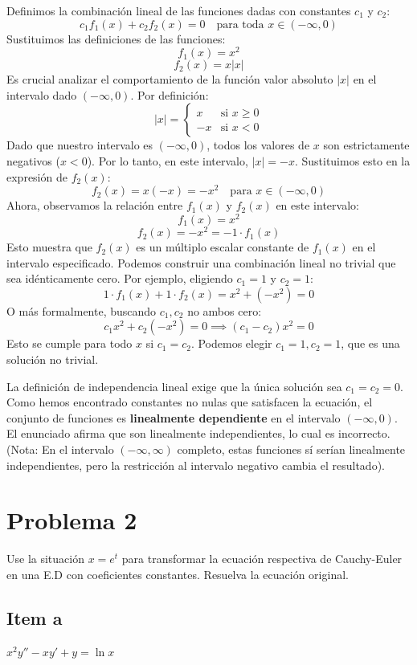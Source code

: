 \documentclass[a4paper]{article}
\begin{document}
Definimos la combinación lineal de las funciones dadas con constantes $c_1$ y $c_2$:
$$
c_1 f_1(x) + c_2 f_2(x) = 0 \quad \text{para toda } x \in (-\infty, 0)
$$
Sustituimos las definiciones de las funciones:
$$
f_1(x) = x^2
$$
$$
f_2(x) = x|x|
$$
Es crucial analizar el comportamiento de la función valor absoluto $|x|$ en el intervalo dado $(-\infty, 0)$. Por definición:
$$
|x| = \begin{cases} x & \text{si } x \geq 0 \\ -x & \text{si } x < 0 \end{cases}
$$
Dado que nuestro intervalo es $(-\infty, 0)$, todos los valores de $x$ son estrictamente negativos ($x < 0$). Por lo tanto, en este intervalo, $|x| = -x$.
Sustituimos esto en la expresión de $f_2(x)$:
$$
f_2(x) = x(-x) = -x^2 \quad \text{para } x \in (-\infty, 0)
$$
Ahora, observamos la relación entre $f_1(x)$ y $f_2(x)$ en este intervalo:
$$
f_1(x) = x^2
$$
$$
f_2(x) = -x^2 = -1 \cdot f_1(x)
$$
Esto muestra que $f_2(x)$ es un múltiplo escalar constante de $f_1(x)$ en el intervalo especificado. Podemos construir una combinación lineal no trivial que sea idénticamente cero. Por ejemplo, eligiendo $c_1 = 1$ y $c_2 = 1$:
$$
1 \cdot f_1(x) + 1 \cdot f_2(x) = x^2 + (-x^2) = 0
$$
O más formalmente, buscando $c_1, c_2$ no ambos cero:
$$
c_1 x^2 + c_2 (-x^2) = 0 \implies (c_1 - c_2)x^2 = 0
$$
Esto se cumple para todo $x$ si $c_1 = c_2$. Podemos elegir $c_1 = 1, c_2 = 1$, que es una solución no trivial.

La definición de independencia lineal exige que la única solución sea $c_1 = c_2 = 0$. Como hemos encontrado constantes no nulas que satisfacen la ecuación, el conjunto de funciones es \textbf{linealmente dependiente} en el intervalo $(-\infty, 0)$. El enunciado afirma que son linealmente independientes, lo cual es incorrecto. (Nota: En el intervalo $(-\infty, \infty)$ completo, estas funciones sí serían linealmente independientes, pero la restricción al intervalo negativo cambia el resultado).

\section{Problema 2}
Use la situación $x= e^t$ para transformar la ecuación respectiva de Cauchy-Euler en una E.D con coeficientes constantes. Resuelva la ecuación original.

\subsection{Item a}
$x^2y'' - xy' + y = \ln x$
\end{document}
